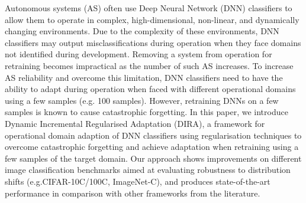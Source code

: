 Autonomous systems (AS) often use Deep Neural Network (DNN) classifiers to allow them to operate in complex, high-dimensional, non-linear, and dynamically changing environments.
%
Due to the complexity of these environments, DNN classifiers may output misclassifications during operation when they face domains not identified during development.
%
Removing a system from operation for retraining becomes impractical as the number of such AS increases. 
%
To increase AS reliability and overcome this limitation, DNN classifiers need to have the ability to adapt during operation when faced with different operational domains using a few samples (e.g. 100 samples).
%
However, retraining DNNs on a few samples is known to cause catastrophic forgetting. 
%
In this paper, we introduce Dynamic Incremental Regularised Adaptation (DIRA), a framework for operational domain adaption of DNN classifiers using regularisation techniques to overcome catastrophic forgetting and achieve adaptation when retraining using a few samples of the target domain. 
%
Our approach shows improvements on different image classification benchmarks aimed at evaluating robustness to distribution shifts (e.g.CIFAR-10C/100C, ImageNet-C), and produces state-of-the-art performance in comparison with other frameworks from the literature.  